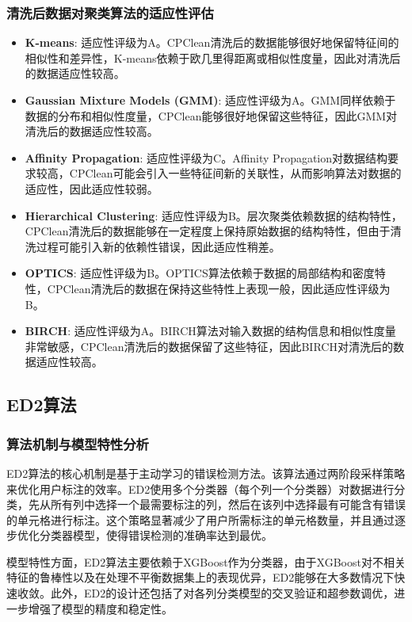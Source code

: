 \documentclass{ctexart} %
\begin{document}
\subsubsection{清洗后数据对聚类算法的适应性评估}
\begin{itemize}
    \item \textbf{K-means}: 适应性评级为A。CPClean清洗后的数据能够很好地保留特征间的相似性和差异性，K-means依赖于欧几里得距离或相似性度量，因此对清洗后的数据适应性较高。
    \item \textbf{Gaussian Mixture Models (GMM)}: 适应性评级为A。GMM同样依赖于数据的分布和相似性度量，CPClean能够很好地保留这些特征，因此GMM对清洗后的数据适应性较高。
    \item \textbf{Affinity Propagation}: 适应性评级为C。Affinity Propagation对数据结构要求较高，CPClean可能会引入一些特征间新的关联性，从而影响算法对数据的适应性，因此适应性较弱。
    \item \textbf{Hierarchical Clustering}: 适应性评级为B。层次聚类依赖数据的结构特性，CPClean清洗后的数据能够在一定程度上保持原始数据的结构特性，但由于清洗过程可能引入新的依赖性错误，因此适应性稍差。
    \item \textbf{OPTICS}: 适应性评级为B。OPTICS算法依赖于数据的局部结构和密度特性，CPClean清洗后的数据在保持这些特性上表现一般，因此适应性评级为B。
    \item \textbf{BIRCH}: 适应性评级为A。BIRCH算法对输入数据的结构信息和相似性度量非常敏感，CPClean清洗后的数据保留了这些特征，因此BIRCH对清洗后的数据适应性较高。
\end{itemize}

\subsection{ED2算法}

\subsubsection{算法机制与模型特性分析}

ED2算法的核心机制是基于主动学习的错误检测方法。该算法通过两阶段采样策略来优化用户标注的效率。ED2使用多个分类器（每个列一个分类器）对数据进行分类，先从所有列中选择一个最需要标注的列，然后在该列中选择最有可能含有错误的单元格进行标注。这个策略显著减少了用户所需标注的单元格数量，并且通过逐步优化分类器模型，使得错误检测的准确率达到最优。

模型特性方面，ED2算法主要依赖于XGBoost作为分类器，由于XGBoost对不相关特征的鲁棒性以及在处理不平衡数据集上的表现优异，ED2能够在大多数情况下快速收敛。此外，ED2的设计还包括了对各列分类模型的交叉验证和超参数调优，进一步增强了模型的精度和稳定性。
\end{document}
